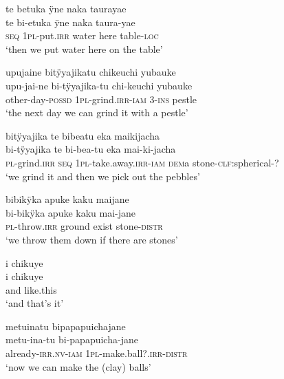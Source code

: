 \ea%
\begingl 
\glpreamble te betuka ÿne naka taurayae\\
\gla te bi-etuka ÿne naka taura-yae\\ 
\glb \textsc{seq} 1\textsc{pl}-put.\textsc{irr} water here table-\textsc{loc}\\ 
\glft ‘then we put water here on the table’\\ 
\endgl
\xe


\ea%
\begingl
\glpreamble upujaine bitÿyajikatu chikeuchi yubauke\\
\gla upu-jai-ne bi-tÿyajika-tu chi-keuchi yubauke\\
\glb other-day-\textsc{possd} 1\textsc{pl}-grind.\textsc{irr}-\textsc{iam} 3-\textsc{ins} pestle\\
\glft ‘the next day we can grind it with a pestle’
\endgl
\xe

\ea%
\begingl 
\glpreamble bitÿyajika te bibeatu eka maikijacha\\
\gla bi-tÿyajika te bi-bea-tu eka mai-ki-jacha\\ 
\textsc{pl}-grind.\textsc{irr} \textsc{seq} 1\textsc{pl}-take.away.\textsc{irr}-\textsc{iam} \textsc{dem}a stone-\textsc{clf:}spherical-?\\ 
\glft ‘we grind it and then we pick out the pebbles’\\ 
\endgl
\xe


\ea%
\begingl 
\glpreamble bibikÿka apuke kaku maijane\\
\gla bi-bikÿka apuke kaku mai-jane\\ 
\textsc{pl}-throw.\textsc{irr} ground exist stone-\textsc{distr}\\ 
\glft ‘we throw them down if there are stones’\\ 
\endgl
\xe


\ea%
\begingl 
\glpreamble i chikuye\\
\gla i chikuye\\ 
\glb and like.this\\ 
\glft ‘and that’s it’\\ 
\endgl
\xe


\ea%
\begingl 
\glpreamble metuinatu bipapapuichajane\\
\gla metu-ina-tu bi-papapuicha-jane\\ 
\glb already-\textsc{irr.nv}-\textsc{iam} 1\textsc{pl}-make.ball?.\textsc{irr}-\textsc{distr}\\ 
\glft ‘now we can make the (clay) balls’\\ 
\endgl
\xe


